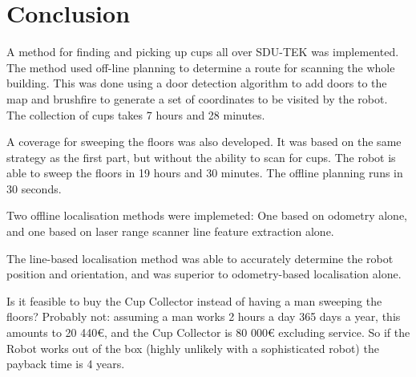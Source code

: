 \section{Conclusion}
\label{sec:conclusion}
A method for finding and picking up cups all over SDU-TEK was implemented. The method used off-line planning to determine a route for scanning the whole building. 
This was done using a door detection algorithm to add doors to the map and brushfire to generate a set of coordinates to be visited by the robot.
The collection of cups takes 7 hours and 28 minutes.

A coverage for sweeping the floors was also developed. It was based on the same strategy as the first part, but without the ability to scan for cups. The robot is able to sweep the floors in 19 hours and 30 minutes. The offline planning runs in 30 seconds. 

Two offline localisation methods were implemeted:
One based on odometry alone, and one based on laser range scanner line feature extraction alone.

The line-based localisation method was able to accurately determine the robot position and orientation,
and was superior to odometry-based localisation alone.

Is it feasible to buy the Cup Collector instead of having a man sweeping the floors?
Probably not: assuming a man works 2 hours a day 365 days a year, this amounts to 20 440\(\euro\),
and the Cup Collector is 80 000\(\euro\) excluding service.
So if the Robot works out of the box (highly unlikely with a sophisticated robot) the payback time is 4 years.